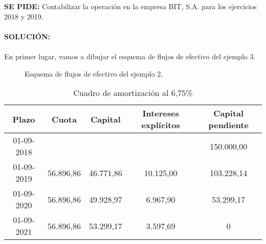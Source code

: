 \textbf{SE PIDE:} Contabilizar la operación en la empresa BIT, S.A. para los ejercicios 2018 y 2019.
\\\\
\textbf{SOLUCIÓN:} \\\\
En primer lugar, vamos a dibujar el esquema de flujos de efectivo del ejemplo 3.
\begin{figure}[H]
    \centering
    \caption{Esquema de flujos de efectivo del ejemplo 2.}
    \label{fig:flujo-efectivo-ejemplo2}
\end{figure}


\begin{table}[h]
    \centering
    \begin{tabular}{ccccc}
        \toprule
        \textbf{Plazo} & \textbf{Cuota} & \textbf{Capital} & \textbf{Intereses explícitos} & \textbf{Capital pendiente} \\
        \midrule
        01-09-2018 & & & & 150.000,00 \\
        01-09-2019 & 56.896,86 & 46.771,86 & 10.125,00 & 103.228,14 \\
        01-09-2020 & 56.896,86 & 49.928,97 & 6.967,90 & 53.299,17 \\
        01-09-2021 & 56.896,86 & 53.299,17 & 3.597,69 & 0 \\
        \bottomrule
    \end{tabular}
    \caption{Cuadro de amortización al 6,75\%}
    \label{tab:amortizacion_675}
\end{table}

